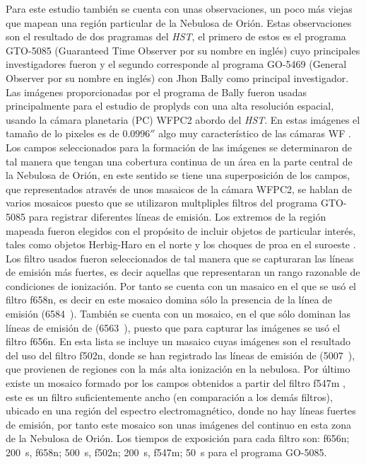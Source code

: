 Para este estudio también se cuenta con unas observaciones, un poco más viejas que mapean una región particular de la Nebulosa de Orión. Estas observaciones son el resultado de dos pragramas del \textit{HST}, el primero de estos es el programa GTO-5085 (Guaranteed Time Observer  por su nombre en inglés) cuyo principales investigadores fueron  \citet{Odell:1996} y el segundo corresponde al programa GO-5469 (General Observer por su nombre en inglés) con Jhon Bally como principal investigador. Las imágenes proporcionadas por el programa de Bally fueron usadas principalmente para el estudio de proplyds con una  alta resolución espacial, usando la cámara planetaria (PC) WFPC2 abordo del \textit{HST}. En estas imágenes el tamaño de lo pixeles es de \(0.0996''\) algo muy característico de las cámaras WF \citep{Holtzman:1995}. Los campos seleccionados para la formación de las imágenes se determinaron de tal manera que tengan una cobertura continua de un área en la parte central de la Nebulosa de Orión, en este sentido se tiene una superposición de los campos, que representados através de unos  masaicos de la cámara WFPC2, se hablan de varios mosaicos puesto que se utilizaron multpliples filtros del programa GTO-5085 para registrar diferentes líneas de emisión. Los extremos de la región mapeada fueron elegidos con el propósito de incluir objetos de particular interés, tales como objetos Herbig-Haro en el norte y los choques de proa en el suroeste \citep{Odell:1996}.\\

 Los filtro usados fueron seleccionados de tal manera que se capturaran las líneas de emisión más fuertes, es decir aquellas que representaran un rango razonable de condiciones de ionización. Por tanto se cuenta con un masaico en el que se usó el filtro f658n, es decir en este mosaico domina sólo la presencia de la línea de emisión \nii{} (6584~\A{}). También se cuenta con un mosaico, en el que sólo dominan las líneas de emisión de \ha{} (6563~\A{}), puesto que para capturar las imágenes se usó el filtro f656n. En esta lista se incluye un masaico cuyas imágenes son el resultado del uso del filtro f502n, donde se han registrado las líneas de emisión de \oiii{} (5007~\A{}), que provienen de regiones con la más alta ionización en la nebulosa. Por último existe un mosaico formado por los campos obtenidos a partir del filtro f547m \citep{Burrows:1995}, este es un filtro suficientemente ancho (en comparación a los demás filtros), ubicado en una región del espectro electromagnético, donde no hay líneas fuertes de emisión, por tanto este mosaico son unas imágenes del continuo en esta zona de la Nebulosa de Orión. Los tiempos de exposición para cada filtro son: f656n;  200~s, f658n; 500~s, f502n; 200~s, f547m; 50~s para el programa GO-5085. 



% 

% 
